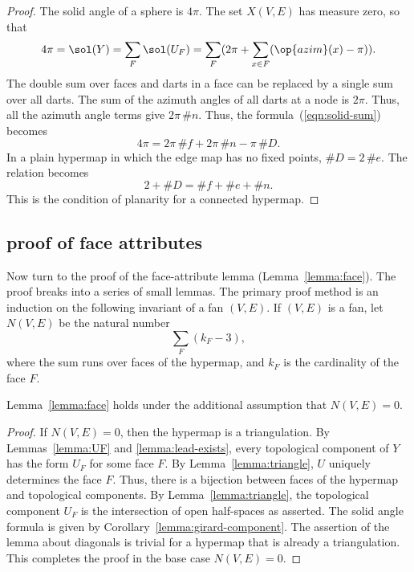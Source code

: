 \begin{proof}  The solid angle of a sphere is $4\pi$.  The set $X(V,E)$
has measure zero, so that
\begin{equation}\label{eqn:solid-sum}
4\pi = \sol(Y)= \sum_F \sol(U_F) = 
\sum_F ( 2\pi + \sum_{x\in F} (\op{azim}(x)-\pi) ).
\end{equation}
The double sum over faces and darts in a face can be replaced by
a single sum over all darts.  
The sum of the azimuth angles of all darts at a node is $2\pi$. Thus,
all the azimuth angle terms give $2\pi\,\#n$.
Thus, the formula~(\ref{eqn:solid-sum}) becomes
$$
4\pi = 2\pi\, \#f +2\pi\,\#n - \pi\, \#D.
$$
In a plain hypermap in which the edge map has no fixed points, $\#D = 2\,\#e$.
The relation becomes
$$
2 + \#D = \#f + \#e + \#n.
$$
This is the condition of planarity for a connected hypermap.
\end{proof}
%

\subsection{proof of face attributes}

Now turn to the proof of the face-attribute lemma (Lemma~\ref{lemma:face}).  The proof breaks into a series of small lemmas.  The primary proof method is an induction on the following invariant of a fan $(V,E)$.  If $(V,E)$ is a fan,  let $N(V,E)$ be the natural number
$$
\sum_F (k_F - 3),
$$
where the sum runs over faces of the  hypermap, and $k_F$ is the cardinality of the face $F$.

\begin{lemma} Lemma~\ref{lemma:face} holds under the additional assumption that $N(V,E) = 0$.
\end{lemma}
%
%
%

\begin{proof}
If $N(V,E)=0$, then the hypermap is a triangulation.  By Lemmas~\ref{lemma:UF} and \ref{lemma:lead-exists}, every topological component of $Y$ has
the form $U_F$ for some face $F$.  By Lemma~\ref{lemma:triangle}, $U$ uniquely determines the face $F$.  Thus, there is a bijection between faces of the hypermap and topological components.  By Lemma~\ref{lemma:triangle}, the topological component $U_F$ is the intersection of open half-spaces as asserted.  The solid angle formula is given by Corollary~\ref{lemma:girard-component}.  The assertion of the lemma about diagonals 
is trivial for a hypermap that is already a triangulation. This completes the proof in the base case $N(V,E)=0$.
\end{proof}

